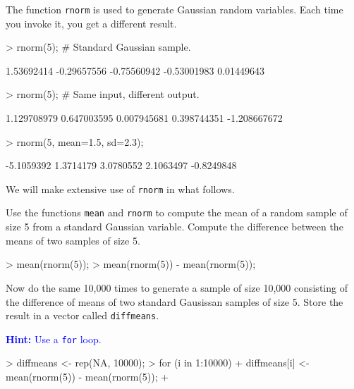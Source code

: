 \documentclass[a4paper]{article}
\theoremstyle{definition}
\begin{document}
The function \texttt {rnorm} is used to generate Gaussian random
variables. Each time you invoke it, you get a different result.
\begin{Schunk}
\begin{Sinput}
> rnorm(5); # Standard Gaussian sample.
\end{Sinput}
\begin{Soutput}
[1]  1.53692414 -0.29657556 -0.75560942 -0.53001983  0.01449643
\end{Soutput}
\begin{Sinput}
> rnorm(5); # Same input, different output.
\end{Sinput}
\begin{Soutput}
[1]  1.129708979  0.647003595  0.007945681  0.398744351 -1.208667672
\end{Soutput}
\begin{Sinput}
> rnorm(5, mean=1.5, sd=2.3);
\end{Sinput}
\begin{Soutput}
[1] -5.1059392  1.3714179  3.0780552  2.1063497 -0.8249848
\end{Soutput}
\end{Schunk}

We will make extensive use of \texttt{rnorm} in what follows.

\begin{Exercise}
Use the functions \texttt{mean} and \texttt{rnorm} to compute the
mean of a random sample of size 5 from a standard Gaussian variable.
Compute the difference between the means of two samples of size 5.
\end{Exercise}
\begin{Answer}
\begin{Schunk}
\begin{Sinput}
> mean(rnorm(5));
> mean(rnorm(5)) - mean(rnorm(5));
\end{Sinput}
\end{Schunk}
\end{Answer}


\begin{Exercise}
\label{genmean}
Now do the same 10,000 times to generate a sample of size 10,000
consisting of the difference of means of two standard Gausissan
samples of size 5. Store the result in a vector called
\texttt{diffmeans}.
\par\noindent\textcolor{Blue}{\textbf{Hint:} Use a \texttt{for} loop.}
\end{Exercise}
\begin{Answer}
\begin{Schunk}
\begin{Sinput}
> diffmeans <- rep(NA, 10000);
> for (i in 1:10000) {
+    diffmeans[i] <- mean(rnorm(5)) - mean(rnorm(5));
+ }
\end{Sinput}
\end{Schunk}
\end{Answer}
\end{document}
